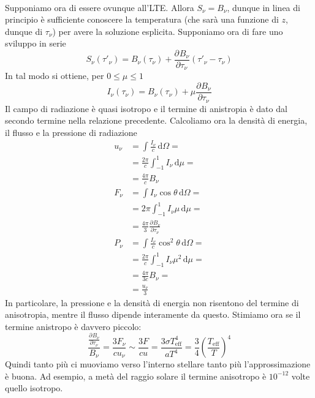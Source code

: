\documentclass[a4paper,11pt]{article}
\renewcommand{\d}{\mathrm{d}} %
\newcommand{\pder}[3][]{\frac{\partial ^{#1}#2}{\partial {#3}^{#1}}} %
\renewcommand{\d}{\,\mathrm{d}}
\theoremstyle{theorem}
\theoremstyle{definition}
\begin{document}
\begin{itemize}
\begin{align*}
	\end{align*}
	Supponiamo ora di essere ovunque all'LTE. Allora $S_\nu=B_\nu$, dunque in linea di principio è sufficiente conoscere la temperatura (che sarà una funzione di $z$, dunque di $\tau_\nu$) per avere la soluzione esplicita. Supponiamo ora di fare uno sviluppo in serie
	\[S_\nu(\tau'_\nu)=B_\nu(\tau_\nu)+\pder{B_\nu}{\tau_\nu}(\tau'_\nu-\tau_\nu)\]
	In tal modo si ottiene, per $0\leq\mu\leq1$
	\[I_\nu(\tau_\nu)=B_\nu(\tau_\nu)+\mu\pder{B_\nu}{\tau_\nu}\]
	Il campo di radiazione è quasi isotropo e il termine di anistropia è dato dal secondo termine nella relazione precedente. Calcoliamo ora la densità di energia, il flusso e la pressione di radiazione
	\begin{align*}
		u_\nu&=\int\frac{I_\nu}{c}\d\Omega=\\&=\frac{2\pi}{c}\int_{-1}^{1}I_\nu\d\mu=\\&=\frac{4\pi}{c}B_\nu\\F_\nu&=\int I_\nu\cos\theta\d\Omega=\\&=2\pi\int_{-1}^{1}I_\nu\mu\d\mu=\\&=\frac{4\pi}{3}\pder{B_\nu}{\tau_\nu}\\P_\nu&=\int\frac{I_\nu}{c}\cos^2\theta\d\Omega=\\&=\frac{2\pi}{c}\int_{-1}^{1}I_\nu\mu^2\d\mu=\\&=\frac{4\pi}{3c}B_\nu=\\&=\frac{u_\nu}{3}
	\end{align*}
	In particolare, la pressione e la densità di energia non risentono del termine di anisotropia, mentre il flusso dipende interamente da questo. Stimiamo ora se il termine anistropo è davvero piccolo:
	\[\frac{\pder{B_\nu}{\tau_\nu}}{B_\nu}=\frac{3F_\nu}{cu_\nu}\sim\frac{3F}{cu}=\frac{3\sigma T_{\textrm{eff}}^4}{a T^4}=\frac{3}{4}\left(\frac{T_\textrm{eff}}{T}\right)^4\]
	Quindi tanto più ci muoviamo verso l'interno stellare tanto più l'approssimazione è buona. Ad esempio, a metà del raggio solare il termine anisotropo è $10^{-12}$ volte quello isotropo.
	

\end{itemize}
\end{document}
